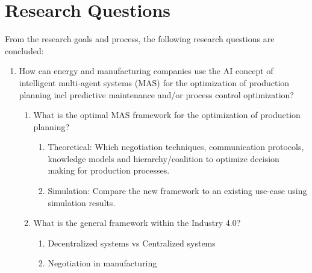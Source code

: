 \section{Research Questions}
From the research goals and process, the following research questions are concluded:
\begin{enumerate}
	\item
	How can energy and manufacturing companies use the AI concept of intelligent multi-agent systems (MAS) for the optimization of production planning incl predictive maintenance and/or process control optimization?
	\begin{enumerate}
		\item
		What is the optimal MAS framework for the optimization of production planning?
		\begin{enumerate}
			\item 
			Theoretical: Which negotiation techniques, communication protocols, knowledge models and hierarchy/coalition to optimize decision making for production processes.
			\item
			Simulation: Compare the new framework to an existing use-case using simulation results.
		\end{enumerate}
		\item
		What is the general framework within the Industry 4.0?
		\begin{enumerate}
			\item 
			Decentralized systems vs Centralized systems
			\item
			Negotiation in manufacturing
		\end{enumerate}
	\end{enumerate}
\end{enumerate}

